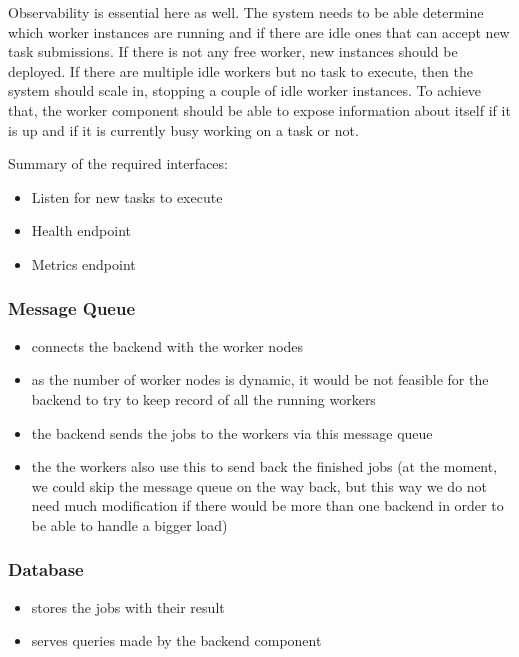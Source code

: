 Observability is essential here as well. The system needs to be able determine which worker instances are running and if there are idle ones that can accept new task submissions. If there is not any free worker, new instances should be deployed. If there are multiple idle workers but no task to execute, then the system should scale in, stopping a couple of idle worker instances. To achieve that, the worker component should be able to expose information about itself if it is up and if it is currently busy working on a task or not.

Summary of the required interfaces: \begin{itemize}
	\item Listen for new tasks to execute
	\item Health endpoint
	\item Metrics endpoint
\end{itemize}


\subsubsection{Message Queue}

\begin{itemize}
	\item connects the backend with the worker nodes
	\item as the number of worker nodes is dynamic, it would be not feasible for the backend to try to keep record of all the running workers
	\item the backend sends the jobs to the workers via this message queue
	\item the the workers also use this to send back the finished jobs (at the moment, we could skip the message queue on the way back, but this way we do not need much modification if there would be more than one backend in order to \eg be able to handle a bigger load)
\end{itemize}

\subsubsection{Database}

\begin{itemize}
	\item stores the jobs with their result 
	\item serves queries made by the backend component
\end{itemize}

